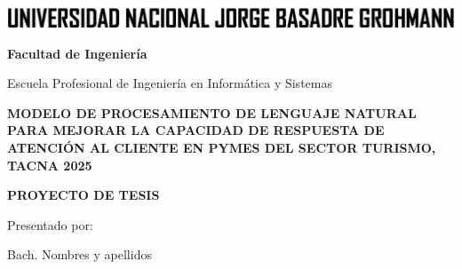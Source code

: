 \begin{titlepage}

\begin{center} 

\begin{center}
\includegraphics[scale=0.22]{Estilos/images/title_unjbg.png}
\end{center}

\vspace*{1.5cm}

{\fontsize{14}{20}\selectfont\bfseries
Facultad de Ingeniería
}

\vspace*{1.5cm}

{\fontsize{14}{20}\selectfont
Escuela Profesional de Ingeniería en Informática y Sistemas
}

\vspace*{1.5cm}
\begin{spacing}{2.0}
{\fontsize{16}{20}\selectfont\bfseries
MODELO DE PROCESAMIENTO DE LENGUAJE NATURAL PARA MEJORAR LA CAPACIDAD DE RESPUESTA DE ATENCIÓN AL CLIENTE EN PYMES DEL SECTOR TURISMO, TACNA 2025
}
\end{spacing}

\vspace*{1.5cm}

{\bfseries\fontsize{14}{22}\selectfont
PROYECTO DE TESIS
}

\vspace*{1.0cm}

{\fontsize{14}{20}\selectfont
Presentado por:
}

\vspace*{1.5cm}

{\fontsize{14}{20}\selectfont
Bach. Nombres y apellidos
}



\vspace*{1.5cm}


\end{center}
\end{titlepage}
